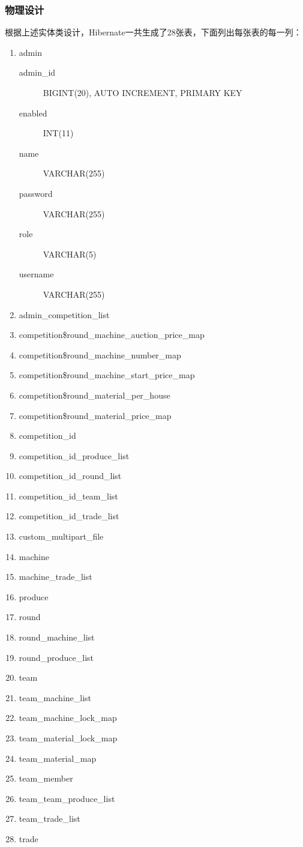 \documentclass{article}
\begin{document}
\subsubsection{物理设计}
根据上述实体类设计，Hibernate一共生成了28张表，下面列出每张表的每一列：
\begin{enumerate}
  \item admin
    \begin{description}
      \item [admin\_id] BIGINT(20), AUTO INCREMENT, PRIMARY KEY
      \item [enabled] INT(11)
      \item [name] VARCHAR(255)
      \item [password] VARCHAR(255)
      \item [role] VARCHAR(5)
      \item [username] VARCHAR(255)
    \end{description}
  \item admin\_competition\_list
  \item competition\$round\_machine\_auction\_price\_map
  \item competition\$round\_machine\_number\_map
  \item competition\$round\_machine\_start\_price\_map
  \item competition\$round\_material\_per\_house
  \item competition\$round\_material\_price\_map
  \item competition\_id
  \item competition\_id\_produce\_list
  \item competition\_id\_round\_list
  \item competition\_id\_team\_list
  \item competition\_id\_trade\_list
  \item custom\_multipart\_file
  \item machine
  \item machine\_trade\_list
  \item produce
  \item round
  \item round\_machine\_list
  \item round\_produce\_list
  \item team
  \item team\_machine\_list
  \item team\_machine\_lock\_map
  \item team\_material\_lock\_map
  \item team\_material\_map
  \item team\_member
  \item team\_team\_produce\_list
  \item team\_trade\_list
  \item trade
\end{enumerate}
\end{document}
